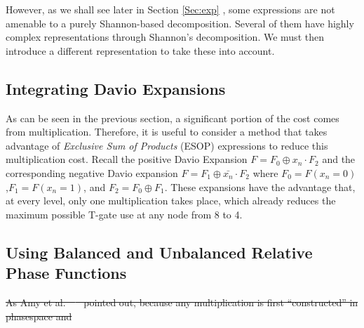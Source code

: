 \documentclass[paper]{ieice}
\providecommand{\DIFdel}[1]{{\protect\color{red}\sout{#1}}}                      %
\providecommand{\DIFaddbegin}{} %
\providecommand{\DIFdelbegin}{} %
\providecommand{\DIFdelend}{} %
\newcommand{\DIFscaledelfig}{0.5}
\newlength{\DIFdelgraphicswidth} %
\newlength{\DIFdelgraphicsheight} %
\newcommand{\DIFaddincludegraphics}[2][]{{\color{blue}\fbox{\DIFOincludegraphics[#1]{#2}}}} %
\newcommand{\DIFdelincludegraphics}[2][]{%
\sbox{\DIFdelgraphicsbox}{\DIFOincludegraphics[#1]{#2}}%
\settoboxwidth{\DIFdelgraphicswidth}{\DIFdelgraphicsbox} %
\settoboxtotalheight{\DIFdelgraphicsheight}{\DIFdelgraphicsbox} %
\scalebox{\DIFscaledelfig}{%
\parbox[b]{\DIFdelgraphicswidth}{\usebox{\DIFdelgraphicsbox}\\[-\baselineskip] \rule{\DIFdelgraphicswidth}{0em}}\llap{\resizebox{\DIFdelgraphicswidth}{\DIFdelgraphicsheight}{%
\setlength{\unitlength}{\DIFdelgraphicswidth}%
\begin{picture}(1,1)%
\thicklines\linethickness{2pt} %
{\color[rgb]{1,0,0}\put(0,0){\framebox(1,1){}}}%
{\color[rgb]{1,0,0}\put(0,0){\line( 1,1){1}}}%
{\color[rgb]{1,0,0}\put(0,1){\line(1,-1){1}}}%
\end{picture}%
}\hspace*{3pt}}} %
} %
\DeclareRobustCommand{\DIFaddbegin}{\DIFOaddbegin \let\includegraphics\DIFaddincludegraphics} %
\DeclareRobustCommand{\DIFdelbegin}{\DIFOdelbegin \let\includegraphics\DIFdelincludegraphics} %
\DeclareRobustCommand{\DIFdelend}{\DIFOaddend \let\includegraphics\DIFOincludegraphics} %
\begin{document}
However, as we shall see later in Section \ref{Sec:exp} , some expressions are not amenable to a purely Shannon-based decomposition. Several of them have highly complex representations through Shannon's decomposition.
We must then introduce a different representation to take these into account.

\subsection{Integrating Davio Expansions}
\label{Subsec:davio}
As can be seen in the previous section, a significant portion of the cost comes from multiplication.
Therefore, it is useful to consider a method that takes advantage of {\it Exclusive Sum of Products} (ESOP)
expressions to reduce this multiplication cost. Recall the positive Davio Expansion $F=F_0\oplus x_n \cdot F_2$ and the corresponding
negative Davio expansion $F=F_1 \oplus \bar{x_n} \cdot F_2$ where $F_0 = F(x_n=0)$,$F_1 = F(x_n=1)$,
and $F_2 = F_0 \oplus F_1$. These expansions have the advantage that, at every level, only one
multiplication takes place, which already reduces the maximum possible T-gate use at any node from
8 to 4.  

\subsection{Using Balanced and Unbalanced Relative Phase Functions}
\label{Subsec:balanced}
\DIFdelbegin \DIFdel{As Amy et al.~\mbox{%
\cite{bib-amy-phase-state} }\hskip0pt%
pointed out, because any multiplication is first ``constructed''
in phasespace and }\DIFdelend \DIFaddbegin 
\end{document}
